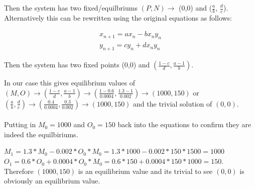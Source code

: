 \documentclass{article}
\begin{document}
\begin{enumerate}[1.]
\begin{enumerate}[(a)]
Then the system has two fixed/equilbriums $(P,N) \to$ (0,0) and ($\frac{a}{b}$, $\frac{d}{c}$). Alternatively this can be rewritten using the original equations as follows:

\begin{gather*}
x_{n+1} = ax_n-bx_ny_n \\
y_{n+1} = cy_n + dx_ny_n
\end{gather*}

Then the system has two fixed points (0,0) and $(\frac{1-c}{d},\frac{a-1}{b})$. 

In our case this gives equilibrium values of $(M,O) \to (\frac{1-c}{d},\frac{a-1}{b}) \to (\frac{1 - 0.6}{0.0004}, \frac{1.3 - 1}{0.002}) \to (1000, 150)$ or $(\frac{a}{b}, \frac{d}{c}) \to (\frac{0.4}{0.0004}, \frac{0.3}{0.002}) \to (1000, 150)$ and the trivial solution of $(0,0)$.  \\ \\

Putting in $M_0 = 1000$ and $O_0 = 150$ back into the equations to confirm they are indeed the equilbiriums.

$M_1 = 1.3 * M_0 - 0.002 * O_0 * M_0 = 1.3 * 1000 - 0.002 * 150 * 1500 = 1000$ \\
$O_1 = 0.6 * O_0 + 0.0004 * O_0 * M_0 = 0.6 * 150 + 0.0004 * 150 * 1000 = 150$. \\

Therefore $(1000, 150)$ is an equilibrium value and its trivial to see $(0,0)$ is obviously an equilibrium value.


\end{enumerate}
\end{enumerate}
\end{document}
